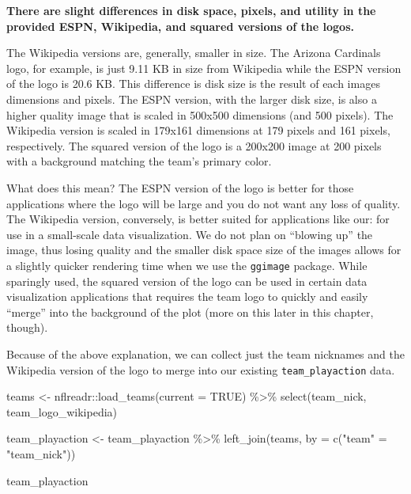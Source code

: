 \documentclass[
  letterpaper,
]{krantz}
\newenvironment{Shaded}{\begin{snugshade}}{\end{snugshade}}
\newcommand{\AttributeTok}[1]{\textcolor[rgb]{0.40,0.45,0.13}{#1}}
\newcommand{\ConstantTok}[1]{\textcolor[rgb]{0.56,0.35,0.01}{#1}}
\newcommand{\FunctionTok}[1]{\textcolor[rgb]{0.28,0.35,0.67}{#1}}
\newcommand{\NormalTok}[1]{\textcolor[rgb]{0.00,0.23,0.31}{#1}}
\newcommand{\OtherTok}[1]{\textcolor[rgb]{0.00,0.23,0.31}{#1}}
\newcommand{\SpecialCharTok}[1]{\textcolor[rgb]{0.37,0.37,0.37}{#1}}
\newcommand{\StringTok}[1]{\textcolor[rgb]{0.13,0.47,0.30}{#1}}
\begin{document}
\begin{tcolorbox}[enhanced jigsaw, colback=white, leftrule=.75mm, breakable, colframe=quarto-callout-note-color-frame, bottomtitle=1mm, rightrule=.15mm, left=2mm, opacityback=0, bottomrule=.15mm, arc=.35mm, coltitle=black, colbacktitle=quarto-callout-note-color!10!white, toptitle=1mm, titlerule=0mm, title=\textcolor{quarto-callout-note-color}{\faInfo}\hspace{0.5em}{Note}, toprule=.15mm, opacitybacktitle=0.6]

\textbf{There are slight differences in disk space, pixels, and utility
in the provided ESPN, Wikipedia, and squared versions of the logos.}

The Wikipedia versions are, generally, smaller in size. The Arizona
Cardinals logo, for example, is just 9.11 KB in size from Wikipedia
while the ESPN version of the logo is 20.6 KB. This difference is disk
size is the result of each images dimensions and pixels. The ESPN
version, with the larger disk size, is also a higher quality image that
is scaled in 500x500 dimensions (and 500 pixels). The Wikipedia version
is scaled in 179x161 dimensions at 179 pixels and 161 pixels,
respectively. The squared version of the logo is a 200x200 image at 200
pixels with a background matching the team's primary color.

What does this mean? The ESPN version of the logo is better for those
applications where the logo will be large and you do not want any loss
of quality. The Wikipedia version, conversely, is better suited for
applications like our: for use in a small-scale data visualization. We
do not plan on ``blowing up'' the image, thus losing quality and the
smaller disk space size of the images allows for a slightly quicker
rendering time when we use the \texttt{ggimage} package. While sparingly
used, the squared version of the logo can be used in certain data
visualization applications that requires the team logo to quickly and
easily ``merge'' into the background of the plot (more on this later in
this chapter, though).

\end{tcolorbox}

Because of the above explanation, we can collect just the team nicknames
and the Wikipedia version of the logo to merge into our existing
\texttt{team\_playaction} data.

\begin{Shaded}
\begin{Highlighting}[]
\NormalTok{teams }\OtherTok{\textless{}{-}}\NormalTok{ nflreadr}\SpecialCharTok{::}\FunctionTok{load\_teams}\NormalTok{(}\AttributeTok{current =} \ConstantTok{TRUE}\NormalTok{) }\SpecialCharTok{\%\textgreater{}\%}
  \FunctionTok{select}\NormalTok{(team\_nick, team\_logo\_wikipedia)}

\NormalTok{team\_playaction }\OtherTok{\textless{}{-}}\NormalTok{ team\_playaction }\SpecialCharTok{\%\textgreater{}\%}
  \FunctionTok{left\_join}\NormalTok{(teams, }\AttributeTok{by =} \FunctionTok{c}\NormalTok{(}\StringTok{"team"} \OtherTok{=} \StringTok{"team\_nick"}\NormalTok{))}

\NormalTok{team\_playaction}
\end{Highlighting}
\end{Shaded}
\end{document}
